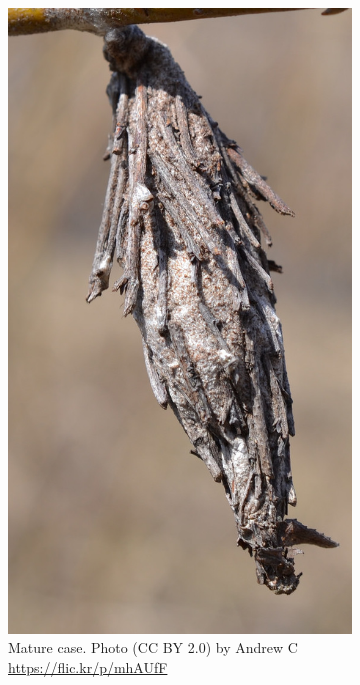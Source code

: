 \documentclass[letterpaper, 11pt]{article}
\begin{document}
\begin{figure}[ht!]
\begin{subfigure}[ht!]{0.16\textwidth}
        \includegraphics[width=\textwidth]{psychid2}
        \caption{Mature case. Photo (CC BY 2.0) by Andrew C \url{https://flic.kr/p/mhAUfF}}
        \label{fig:psychid2}
    \end{subfigure}
    \hfill %
    \begin{subfigure}[ht!]{0.35\textwidth}

\end{subfigure}
\end{figure}
\end{document}
